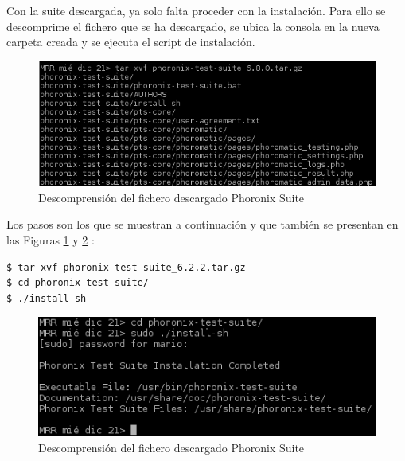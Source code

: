 Con la suite descargada, ya solo falta proceder con la instalación. Para ello se descomprime el fichero que se ha descargado, se ubica la consola en la nueva carpeta creada y se ejecuta el script de instalación.

\begin{figure}[H] %
	\centering
	\includegraphics[scale=1]{figuras/ejercicio1/figura1-3.png} 
	\caption{Descomprensión del fichero descargado Phoronix Suite} 
	\label{fig:figura1-3}
\end{figure}

Los pasos son los que se muestran a continuación y que también se presentan en las Figuras \ref{fig:figura1-3} y \ref{fig:figura1-4} \cite{enlace1}:
\begin{lstlisting}[style=fich]
$ tar xvf phoronix-test-suite_6.2.2.tar.gz
$ cd phoronix-test-suite/
$ ./install-sh
\end{lstlisting}
\vspace{-28pt}
\begin{figure}[H] %
	\centering
	\includegraphics[scale=1]{figuras/ejercicio1/figura1-4.png} 
	\caption{Descomprensión del fichero descargado Phoronix Suite} 
	\label{fig:figura1-4}
\end{figure}


